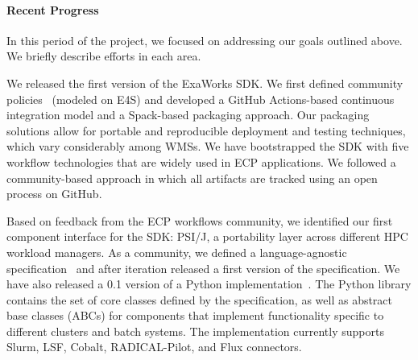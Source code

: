 \paragraph{Recent Progress}



In this period of the project, we focused on addressing our goals outlined above. 
We briefly describe efforts in each area. 

We released the first version of the ExaWorks SDK. We first defined
community policies~\cite{sdk-policies} (modeled on E4S) and
developed a GitHub Actions-based continuous integration model and 
a Spack-based packaging approach. 
Our packaging solutions allow for portable and reproducible deployment and 
testing techniques, which vary considerably among WMSs.
We have bootstrapped the SDK with five workflow technologies 
that are widely used in ECP applications. We followed a community-based
approach in which all artifacts are tracked using an open process on GitHub. 

Based on feedback from the ECP workflows community, we identified our 
first component interface for the SDK: PSI/J, a portability layer across different HPC workload managers. 
As a community, we defined a language-agnostic specification~\cite{jpsi-spec}
and after iteration released a first version of the specification. 
We have also released a 0.1 version of a Python implementation~\cite{jpsi-python}. 
The Python library contains the set of
core classes defined by the specification, as well as abstract base classes (ABCs) for components 
that implement functionality specific to different clusters and batch systems.
The implementation currently supports Slurm, LSF, Cobalt, RADICAL-Pilot, and Flux connectors. 

